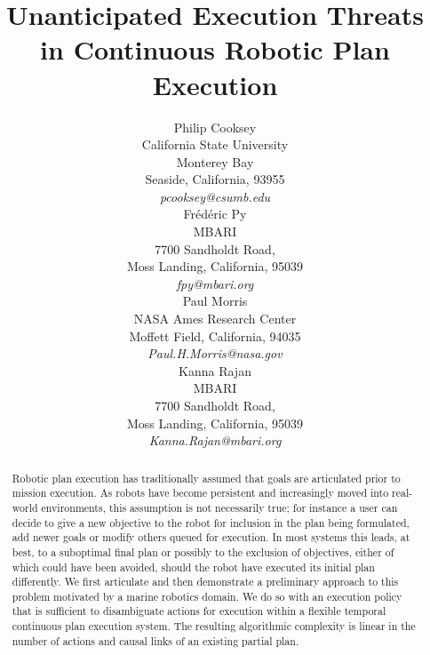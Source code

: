 \documentclass[letterpaper]{article}
\begin{document}
\title{Unanticipated Execution Threats in Continuous Robotic Plan Execution}
\author{Philip Cooksey\\
\small{California State University}\\ 
\small{Monterey Bay}\\
\small{Seaside, California, 93955}\\
\small{\emph{pcooksey@csumb.edu}}\\
\And Fr\'ed\'eric Py\\
\small{MBARI}\\
\small{7700 Sandholdt Road,}\\
\small{Moss Landing, California, 95039}\\
\small{\emph{fpy@mbari.org}}\\
\And Paul Morris\\
\small{NASA Ames Research Center}\\
\small{Moffett Field, California, 94035}\\
\small{\emph{Paul.H.Morris@nasa.gov}}\\
\And Kanna Rajan\\
\small{MBARI}\\
\small{7700 Sandholdt Road,}\\
\small{Moss Landing, California, 95039}\\
\small{\emph{Kanna.Rajan@mbari.org}}\\
}

\maketitle{}

\begin{abstract}

  Robotic plan execution has traditionally assumed that goals are
  articulated prior to mission execution. As robots have become
  persistent and increasingly moved into real-world environments, this
  assumption is not necessarily true; for instance a user can decide
  to give a new objective to the robot for inclusion in the plan being
  formulated, add newer goals or modify others queued for
  execution. In most systems this leads, at best, to a suboptimal
  final plan or possibly to the exclusion of objectives, either of
  which could have been avoided, should the robot have executed its
  initial plan differently.  We first articulate and then demonstrate
  a preliminary approach to this problem motivated by a marine
  robotics domain. We do so with an execution policy that is
  sufficient to disambiguate actions for execution within a flexible
  temporal continuous plan execution system.  The resulting
  algorithmic complexity is linear in the number of actions and causal
  links of an existing partial plan.

\end{abstract}






 






\footnotesize{


}
\end{document}
